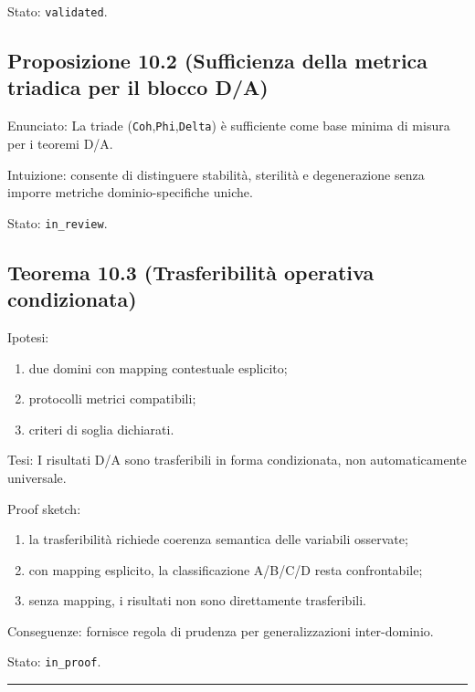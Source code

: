 Stato: \texttt{validated}.

\subsection{Proposizione 10.2 (Sufficienza della metrica triadica per il blocco D/A)}

Enunciato:
La triade (\texttt{Coh},\texttt{Phi},\texttt{Delta}) è sufficiente come base minima di misura per i teoremi D/A.

Intuizione:
consente di distinguere stabilità, sterilità e degenerazione senza imporre metriche dominio-specifiche uniche.

Stato: \texttt{in\_review}.

\subsection{Teorema 10.3 (Trasferibilità operativa condizionata)}

Ipotesi:

\begin{enumerate}
\def\labelenumi{\arabic{enumi}.}
\tightlist
\item
  due domini con mapping contestuale esplicito;
\item
  protocolli metrici compatibili;
\item
  criteri di soglia dichiarati.
\end{enumerate}

Tesi:
I risultati D/A sono trasferibili in forma condizionata, non automaticamente universale.

Proof sketch:

\begin{enumerate}
\def\labelenumi{\arabic{enumi}.}
\tightlist
\item
  la trasferibilità richiede coerenza semantica delle variabili osservate;
\item
  con mapping esplicito, la classificazione A/B/C/D resta confrontabile;
\item
  senza mapping, i risultati non sono direttamente trasferibili.
\end{enumerate}

Conseguenze:
fornisce regola di prudenza per generalizzazioni inter-dominio.

Stato: \texttt{in\_proof}.

\begin{center}\rule{0.5\linewidth}{0.5pt}\end{center}

